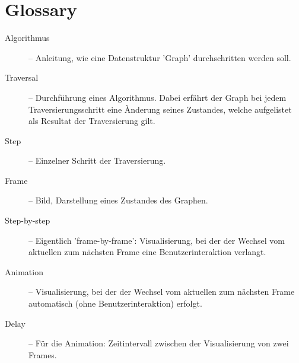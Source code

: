 \section{Glossary}
\label{sec:glossary}
\begin{description}
  \item[Algorithmus] -- Anleitung, wie eine Datenstruktur 'Graph' durchschritten werden soll.
  \item[Traversal] -- Durchf\"uhrung eines Algorithmus. Dabei erf\"ahrt der Graph bei jedem Traversierungsschritt eine \`Anderung seines Zustandes, welche aufgelistet als Resultat der Traversierung gilt.
  \item[Step] -- Einzelner Schritt der Traversierung.
  \item[Frame] -- Bild, Darstellung eines Zustandes des Graphen.
  \item[Step-by-step] -- Eigentlich 'frame-by-frame': Visualisierung, bei der der Wechsel vom aktuellen zum n\"achsten Frame eine Benutzerinteraktion verlangt.
  \item[Animation] -- Visualisierung, bei der der Wechsel vom aktuellen zum n\"achsten Frame automatisch (ohne Benutzerinteraktion) erfolgt.
  \item[Delay] -- F\"ur die Animation: Zeitintervall zwischen der Visualisierung von zwei Frames.
\end{description}